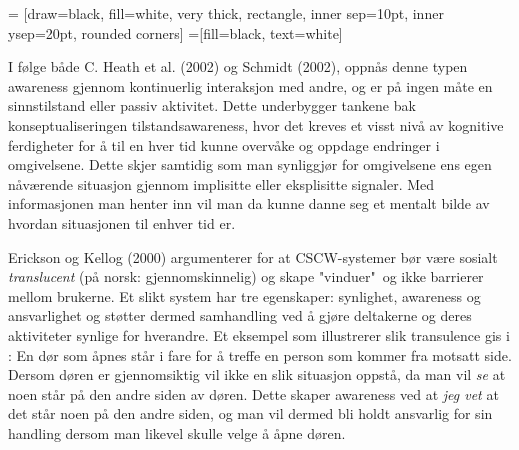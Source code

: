  = [draw=black, fill=white, very thick,
    rectangle, inner sep=10pt, inner ysep=20pt, rounded corners]
 =[fill=black, text=white]
%

\noindent
I følge både C. Heath et al. (2002) \nocite{Heath02} og Schmidt (2002), oppnås denne typen awareness gjennom kontinuerlig interaksjon med andre, og er på ingen måte en sinnstilstand eller passiv aktivitet. Dette underbygger tankene bak konseptualiseringen tilstandsawareness, hvor det kreves et visst nivå av kognitive ferdigheter for å til en hver tid kunne overvåke og oppdage endringer i omgivelsene. Dette skjer samtidig som man synliggjør for omgivelsene ens egen nåværende situasjon gjennom implisitte eller eksplisitte signaler. Med informasjonen man henter inn vil man da kunne danne seg et mentalt bilde av hvordan situasjonen til enhver tid er.

\noindent
Erickson og Kellog (2000) argumenterer for at CSCW-systemer bør være sosialt \emph{translucent} (på norsk: gjennomskinnelig) og skape "vinduer"\ og ikke barrierer mellom brukerne. Et slikt system har tre egenskaper: synlighet, awareness og ansvarlighet og støtter dermed samhandling ved å gjøre deltakerne og deres aktiviteter synlige for hverandre. Et eksempel som illustrerer slik transulence gis i \cite{Erickson00}: En dør som åpnes står i fare for å treffe en person som kommer fra motsatt side. Dersom døren er gjennomsiktig vil ikke en slik situasjon oppstå, da man vil \emph{se} at noen står på den andre siden av døren. Dette skaper awareness ved at \emph{jeg vet} at det står noen på den andre siden, og man vil dermed bli holdt ansvarlig for sin handling dersom man likevel skulle velge å åpne døren.

